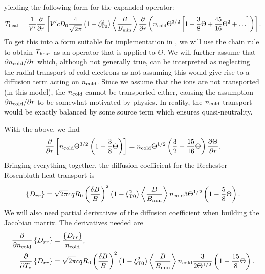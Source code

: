 \documentclass{notes}
\newcommand{\ncold}{n_{\rm cold}}
\newcommand{\Te}{T_e}
\newcommand{\VpVol}{V'}
\begin{document}
    yielding the following form for the expanded operator:
    \begin{equation}
        T_{\rm heat} = \frac{1}{\VpVol}\frac{\partial}{\partial r}\left[
            \VpVol cD_0\frac{4}{\sqrt{2\pi}}\left(1-\xi_{\rm T0}^2\right)\left\langle\frac{B}{B_{\rm min}} \right\rangle
            \frac{\partial}{\partial r}\left( 
                \ncold \Theta^{3/2}\left[ 1 - \frac{3}{8}\Theta + \frac{45}{16}\Theta^2 + \ldots \right]
            \right)
        \right].
    \end{equation}
    To get this into a form suitable for implementation in \DREAM, we will use
    the chain rule to obtain $T_{\rm heat}$ as an operator that is applied to
    $\Theta$. We will further assume that $\partial\ncold/\partial r$ which,
    although not generally true, can be interpreted as neglecting the radial
    transport of cold electrons as not assuming this would give rise to a
    diffusion term acting on $\ncold$. Since we assume that the ions are not
    transported (in this model), the $\ncold$ cannot be transported either,
    causing the assumption $\partial\ncold/\partial r$ to be somewhat motivated
    by physics. In reality, the $\ncold$ transport would be exactly balanced by
    some source term which ensures quasi-neutrality.

    With the above, we find
    \begin{equation}
        \frac{\partial}{\partial r}\left[ \ncold\Theta^{3/2} \left(
            1 - \frac{3}{8}\Theta
        \right)\right] =
        \ncold\Theta^{1/2}\left( \frac{3}{2} - \frac{15}{16}\Theta \right)
        \frac{\partial\Theta}{\partial r}.
    \end{equation}
    Bringing everything together, the diffusion coefficient for the
    Rechester-Rosenbluth heat transport is
    \begin{equation}
        \left\{ D_{rr} \right\} =
        \sqrt{2\pi}cqR_0\left(\frac{\delta B}{B}\right)^2\left(1-\xi_{\rm T0}^2\right)
        \left\langle\frac{B}{B_{\rm min}}\right\rangle\ncold
        3\Theta^{1/2}\left( 1 - \frac{5}{8}\Theta \right).
    \end{equation}
    We will also need partial derivatives of the diffusion coefficient when
    building the Jacobian matrix. The derivatives needed are
    \begin{equation}
        \begin{aligned}
            \frac{\partial}{\partial\ncold}\left\{ D_{rr} \right\} &= \frac{\left\{ D_{rr} \right\}}{\ncold},\\
            \frac{\partial}{\partial\Te}\left\{ D_{rr} \right\} &=
                \sqrt{2\pi}cqR_0\left(\frac{\delta B}{B}\right)^2\left(1-\xi_{\rm T0}^2\right)
                \left\langle\frac{B}{B_{\rm min}}\right\rangle\ncold
                \frac{3}{2\Theta^{1/2}}\left( 1 - \frac{15}{8}\Theta \right).
        \end{aligned}
    \end{equation}
\end{document}
